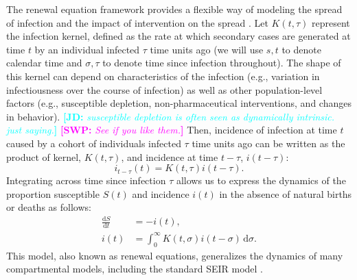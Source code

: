 \documentclass[12pt]{article}
\newcommand{\comment}{\showcomment}
\newcommand{\showcomment}[3]{\textcolor{#1}{\textbf{[#2: }\textsl{#3}\textbf{]}}}
\newcommand{\jd}[1]{\comment{cyan}{JD}{#1}}
\newcommand{\swp}[1]{\comment{magenta}{SWP}{#1}}
\newcommand{\dd}[1]{\ensuremath{\, \mathrm{d}#1}}
\newcommand{\dsigma}{\dd{\sigma}}
\begin{document}
The renewal equation framework provides a flexible way of modeling the spread of infection and the impact of intervention on the spread \citep{fraser2007estimating}.
Let $K(t, \tau)$ represent the infection kernel, defined as the rate at which secondary cases are generated at time $t$ by an individual infected $\tau$ time units ago (we will use $s, t$ to denote calendar time and $\sigma, \tau$ to denote time since infection throughout).
The shape of this kernel can depend on characteristics of the infection (e.g., variation in infectiousness over the course of infection) as well as other population-level factors (e.g., susceptible depletion, non-pharmaceutical interventions, and changes in behavior).
\jd{susceptible depletion is often seen as dynamically intrinsic. just saying.} \swp{See if you like them.}
Then, incidence of infection at time $t$ caused by a cohort of individuals infected $\tau$ time units ago can be written as the product of kernel, $K(t, \tau)$, and incidence at time $t-\tau$, $i(t-\tau)$:
\begin{equation}
i_{t-\tau}(t) = K(t, \tau) i(t-\tau).
\end{equation}
Integrating across time since infection $\tau$ allows us to express the dynamics of the proportion susceptible $S(t)$ and incidence $i(t)$ in the absence of natural births or deaths as follows: 
\begin{align}
\frac{\mathrm{d}S}{\mathrm{d}t} &= - i(t),\\
i(t) &= \int_0^\infty K(t, \sigma) i(t-\sigma) \dsigma.
\label{eq:renewal}
\end{align}
This model, also known as renewal equations, generalizes the dynamics of many compartmental models, including the standard SEIR model \citep{heesterbeek1996concept, diekmann2000mathematical, roberts2004modelling, aldis2005integral, roberts2007model, champredon2018equivalence}.
\end{document}
